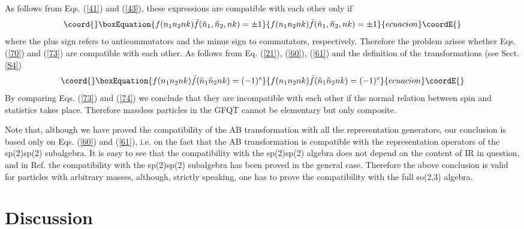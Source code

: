 \documentclass[a4paper,12pt]{article}%
\begin{document}
As follows from Eqs. (\ref{41}) and (\ref{43}),
these expressions are
compatible with each other only if
\begin{equation}\coord{}\boxEquation{
f(n_1n_2nk){\bar f}({\tilde n}_1,{\tilde n}_2,nk)=\pm 1
\label{73}
}{
f(n_1n_2nk){\bar f}({\tilde n}_1,{\tilde n}_2,nk)=\pm 1
}{ecuacion}\coordE{}\end{equation}
where the plus sign refers to anticommutators and the minus
sign to commutators, respectively. Therefore the problem arises
whether Eqs. (\ref{70}) and (\ref{73}) are compatible with
each other. As follows from Eq. (\ref{21}), (\ref{60}),
(\ref{61}) and the definition of the transformations 
\coordHE{} (see Sect. \ref{S4}) 
\begin{equation}\coord{}\boxEquation{
f(n_1n_2nk){\bar f}({\tilde n}_1{\tilde n}_2nk)=(-1)^s
\label{74}
}{
f(n_1n_2nk){\bar f}({\tilde n}_1{\tilde n}_2nk)=(-1)^s
}{ecuacion}\coordE{}\end{equation}
By comparing Eqs. (\ref{73}) and (\ref{74}) we conclude
that they are incompatible with each other if the normal 
relation between spin and statistics takes place. 
Therefore massless particles in the GFQT cannot be
elementary but only composite.

Note that, although we have proved the compatibility of
the AB transformation with all the representation 
generators, our conclusion is based only on Eqs. (\ref{60})
and (\ref{61}), i.e. on the fact that the AB transformation
is compatible with the representation operators of the
sp(2)\myHighlight{$\times$}\coordHE{}sp(2) subalgebra. It is easy to see that
the compatibility with the sp(2)\myHighlight{$\times$}\coordHE{}sp(2) algebra
does not depend on the \coordHE{} content of IR in question,
and in Ref. \cite{lev2} the compatibility with the
sp(2)\myHighlight{$\times$}\coordHE{}sp(2) subalgebra has been proved
in the general case. Therefore the above conclusion is
valid for particles with arbitrary masses, although,
strictly speaking, one has to prove the compatibility
with the full so(2,3) algebra.

\section{Discussion}
\label{S7}
\end{document}
